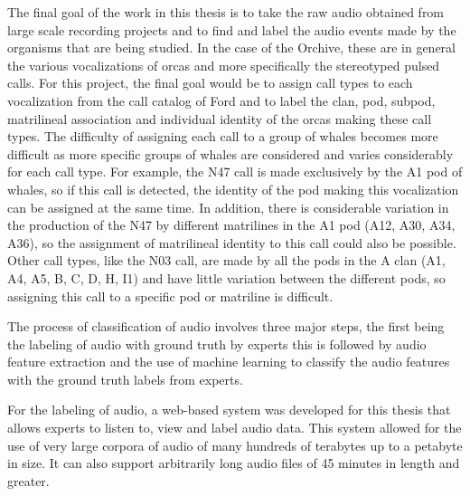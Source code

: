 
\label{chap:evaluation}

The final goal of the work in this thesis is to take the raw audio
obtained from large scale recording projects and to find and label the
audio events made by the organisms that are being studied.  In the
case of the Orchive, these are in general the various vocalizations of
orcas and more specifically the stereotyped pulsed calls.  For this
project, the final goal would be to assign call types to each
vocalization from the call catalog of Ford \cite{ford1987catalogue}
and to label the clan, pod, subpod, matrilineal association and
individual identity of the orcas making these call types.  The difficulty of
assigning each call to a group of whales becomes more difficult as
more specific groups of whales are considered and varies considerably
for each call type.  For example, the N47 call is made exclusively by
the A1 pod of whales, so if this call is detected, the identity of the
pod making this vocalization can be assigned at the same time.  In
addition, there is considerable variation in the production of the N47
by different matrilines in the A1 pod (A12, A30, A34, A36), so the
assignment of matrilineal identity to this call could also be possible.
Other call types, like the N03 call, are made by all the pods in the A clan
(A1, A4, A5, B, C, D, H, I1) and have little variation between the
different pods, so assigning this call to a specific pod or matriline
is difficult.

The process of classification of audio involves three major steps, the
first being the labeling of audio with ground truth by experts this is
followed by audio feature extraction and the use of machine learning
to classify the audio features with the ground truth labels from
experts.

For the labeling of audio, a web-based system was developed for this
thesis that allows experts to listen to, view and label audio data.
This system allowed for the use of very large corpora of audio of many
hundreds of terabytes up to a petabyte in size.  It can also support
arbitrarily long audio files of 45 minutes in length and greater.

